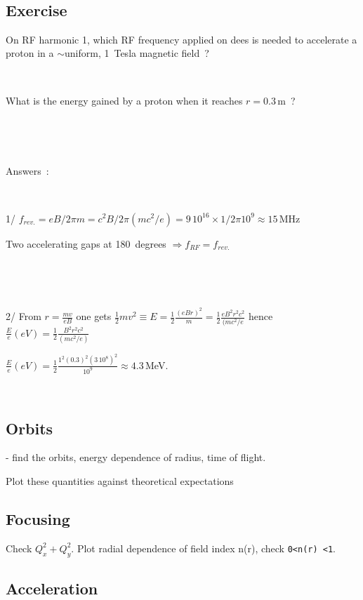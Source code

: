 ~



\subsection*{Exercise}


{
On RF harmonic 1, which RF frequency applied on dees 
is needed to accelerate a proton in a $\sim$uniform, 1~Tesla magnetic field~? 

~

What is the  energy gained by a proton when it reaches $r=0.3\,$m~?
}


~

~

{
Answers~:  

~

1/ $f_{rev.} = e B / 2 \pi m = c^2 B / 2 \pi (mc^2/e) = 9\, 10^{16} \times 1 / 2 \pi 10^9 \approx 15\,$MHz

Two accelerating gaps  at 180~degrees $\Rightarrow  f_{RF} = f_{rev.}$ 

~

~

2/
From $r =\frac{mv}{eB}$ one gets $\frac{1}{2} m v^2 \equiv E  = \frac{1}{2} \frac{(eBr)^2}{m}  = 
\frac{1}{2} \frac{eB^2r^2c^2}{(mc^2/e}  $ hence $\frac{E}{e} (eV) = \frac{1}{2} \frac{B^2r^2c^2}{(mc^2/e)}  $ 

$\frac{E}{e} (eV) = \frac{1}{2} \frac{1^2 (0.3)^2 (3\, 10^8)^2}{10^9} \approx 4.3\, $MeV.  



~
}






\subsection{Orbits}

- find the orbits, energy dependence of radius, time of flight.

Plot these quantities against theoretical expectations


\subsection{Focusing}

Check $Q_x^2 +Q_y^2$. Plot radial dependence of field index n(r), check \verb|0<n(r) <1|.


\subsection{Acceleration}


